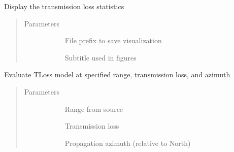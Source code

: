 \documentclass[letterpaper,10pt,english]{sphinxmanual}
\begin{document}
\begin{fulllineitems}
\begin{fulllineitems}
\label{\detokenize{stochprop.propagation:stochprop.propagation.TLossModel.display}}
Display the transmission loss statistics
\begin{quote}\begin{description}
\item[{Parameters}] \leavevmode\begin{description}
\item[{}] \leavevmode
File prefix to save visualization

\item[{}] \leavevmode
Subtitle used in figures

\end{description}

\end{description}\end{quote}

\end{fulllineitems}


\begin{fulllineitems}
\label{\detokenize{stochprop.propagation:stochprop.propagation.TLossModel.eval}}
Evaluate TLoss model at specified range, transmission loss, and azimuth
\begin{quote}\begin{description}
\item[{Parameters}] \leavevmode\begin{description}
\item[{}] \leavevmode
Range from source

\item[{}] \leavevmode
Transmission loss

\item[{}] \leavevmode
Propagation azimuth (relative to North)


\end{description}
\end{description}
\end{quote}
\end{fulllineitems}
\end{fulllineitems}
\end{document}
